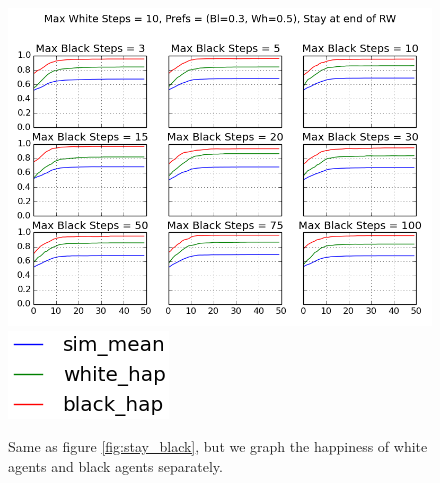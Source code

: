 \documentclass[11pt,twoside]{amsart}
\theoremstyle{theorem}
\theoremstyle{definition}
\theoremstyle{remark}
\begin{document}
    \begin{figure}[p]
        \center
        \includegraphics[scale=0.60]{stay_at_end_rw_change_black_max_decompose_happiness.png}
        \includegraphics[scale=0.60]{stay_at_end_rw_change_black_max_decompose_happiness_legend.png}
        \caption{Same as figure \ref{fig:stay_black}, but we graph the happiness of white agents and black agents separately.}
        \label{fig:stay_black_decomposed}
    \end{figure}
\end{document}
